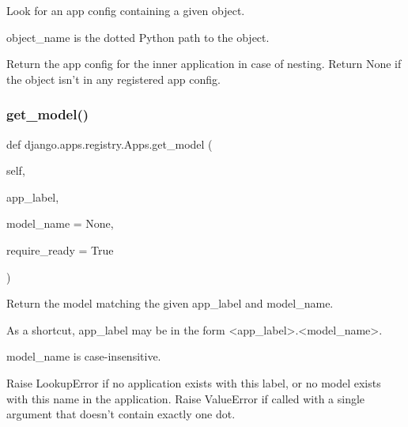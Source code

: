 \begin{DoxyVerb}Look for an app config containing a given object.

object_name is the dotted Python path to the object.

Return the app config for the inner application in case of nesting.
Return None if the object isn't in any registered app config.
\end{DoxyVerb}
 \mbox{\label{classdjango_1_1apps_1_1registry_1_1_apps_a1722738559e3037cf8a08593373b8722}} 
\subsubsection{\texorpdfstring{get\+\_\+model()}{get\_model()}}
{\footnotesize\ttfamily def django.\+apps.\+registry.\+Apps.\+get\+\_\+model (\begin{DoxyParamCaption}\item[{}]{self,  }\item[{}]{app\+\_\+label,  }\item[{}]{model\+\_\+name = {\ttfamily None},  }\item[{}]{require\+\_\+ready = {\ttfamily True} }\end{DoxyParamCaption})}

\begin{DoxyVerb}Return the model matching the given app_label and model_name.

As a shortcut, app_label may be in the form <app_label>.<model_name>.

model_name is case-insensitive.

Raise LookupError if no application exists with this label, or no
model exists with this name in the application. Raise ValueError if
called with a single argument that doesn't contain exactly one dot.
\end{DoxyVerb}
 \mbox{\label{classdjango_1_1apps_1_1registry_1_1_apps_a13f52d8f06f92f62a872ac72369046d8}} 
